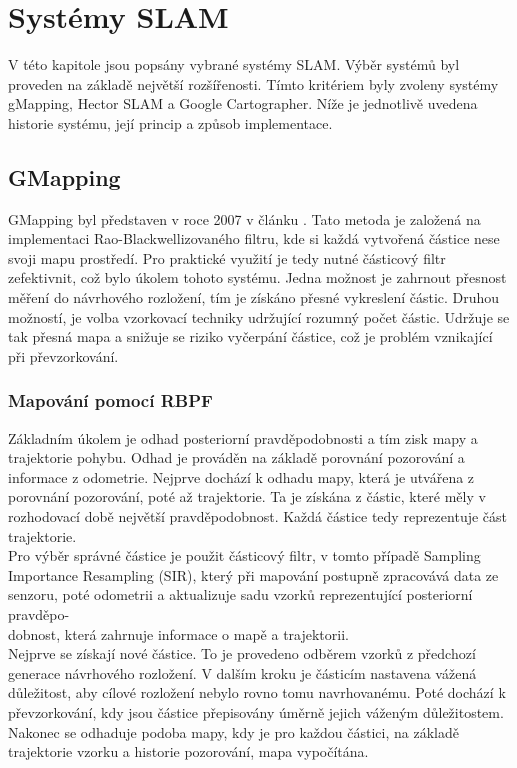 \documentclass[12pt]{report}
\begin{document}
\newpage
\chapter{Systémy SLAM}
V této kapitole jsou popsány vybrané systémy SLAM. Výběr systémů byl proveden na základě největší rozšířenosti. Tímto kritériem byly zvoleny systémy gMapping, Hector SLAM a Google Cartographer. Níže je jednotlivě uvedena historie systému, její princip a způsob implementace.

\section{GMapping}
GMapping byl představen v roce 2007 v článku \cite{Grisetti2007}. Tato metoda je založená na implementaci Rao-Blackwellizovaného filtru, kde si každá vytvořená částice nese svoji mapu prostředí. Pro praktické využití je tedy nutné částicový filtr zefektivnit, což bylo úkolem tohoto systému. Jedna možnost je zahrnout přesnost měření do návrhového rozložení, tím je získáno přesné vykreslení částic. Druhou možností, je volba vzorkovací techniky udržující rozumný počet částic. Udržuje se tak přesná mapa a snižuje se riziko vyčerpání částice, což je problém vznikající při převzorkování.\\

\subsection{Mapování pomocí RBPF}
Základním úkolem je odhad posteriorní pravděpodobnosti a tím zisk mapy a trajektorie pohybu. Odhad je prováděn na základě porovnání pozorování a informace z odometrie. Nejprve dochází k odhadu mapy, která je utvářena z porovnání pozorování, poté až trajektorie. Ta je získána z částic, které měly v rozhodovací době největší pravděpodobnost. Každá částice tedy reprezentuje část trajektorie.\\
\indent Pro výběr správné částice je použit částicový filtr, v tomto případě Sampling Importance Resampling (SIR), který při mapování postupně zpracovává data ze senzoru, poté odometrii a aktualizuje sadu vzorků reprezentující posteriorní pravděpo-\\dobnost, která zahrnuje informace o mapě a trajektorii. \\
\indent Nejprve se získají nové částice. To je provedeno odběrem vzorků z předchozí generace návrhového rozložení. V dalším kroku je částicím nastavena vážená důležitost, aby cílové rozložení nebylo rovno tomu navrhovanému. Poté dochází k převzorkování, kdy jsou částice přepisovány úměrně jejich váženým důležitostem. Nakonec se odhaduje podoba mapy, kdy je pro každou částici, na základě trajektorie vzorku a historie pozorování, mapa vypočítána.
\end{document}
